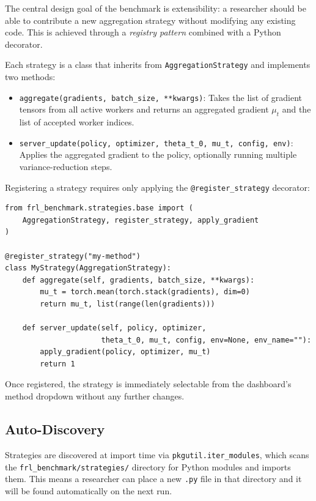 The central design goal of the benchmark is extensibility: a researcher should be
able to contribute a new aggregation strategy without modifying any existing code.
This is achieved through a \emph{registry pattern} combined with a Python
decorator.

Each strategy is a class that inherits from \texttt{AggregationStrategy} and
implements two methods:

\begin{itemize}
    \item \texttt{aggregate(gradients, batch\_size, **kwargs)}: Takes the list of
          gradient tensors from all active workers and returns an aggregated gradient
          $\mu_t$ and the list of accepted worker indices.
    \item \texttt{server\_update(policy, optimizer, theta\_t\_0, mu\_t, config,
          env)}: Applies the aggregated gradient to the policy, optionally running
          multiple variance-reduction steps.
\end{itemize}

Registering a strategy requires only applying the \texttt{@register\_strategy}
decorator:

\begin{verbatim}
from frl_benchmark.strategies.base import (
    AggregationStrategy, register_strategy, apply_gradient
)

@register_strategy("my-method")
class MyStrategy(AggregationStrategy):
    def aggregate(self, gradients, batch_size, **kwargs):
        mu_t = torch.mean(torch.stack(gradients), dim=0)
        return mu_t, list(range(len(gradients)))

    def server_update(self, policy, optimizer,
                      theta_t_0, mu_t, config, env=None, env_name=""):
        apply_gradient(policy, optimizer, mu_t)
        return 1
\end{verbatim}

Once registered, the strategy is immediately selectable from the dashboard's
method dropdown without any further changes.

\subsection{Auto-Discovery}

Strategies are discovered at import time via \texttt{pkgutil.iter\_modules}, which
scans the \texttt{frl\_benchmark/strategies/} directory for Python modules and
imports them. This means a researcher can place a new \texttt{.py} file in that
directory and it will be found automatically on the next run.

